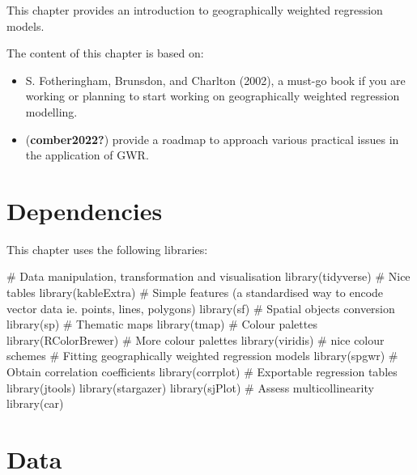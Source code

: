 \documentclass[
  letterpaper,
  krantz2]{style/krantz}
\newenvironment{Shaded}{\begin{snugshade}}{\end{snugshade}}
\newcommand{\CommentTok}[1]{\textcolor[rgb]{0.37,0.37,0.37}{#1}}
\newcommand{\FunctionTok}[1]{\textcolor[rgb]{0.28,0.35,0.67}{#1}}
\newcommand{\NormalTok}[1]{\textcolor[rgb]{0.00,0.23,0.31}{#1}}
\begin{document}
This chapter provides an introduction to geographically weighted
regression models.

The content of this chapter is based on:

\begin{itemize}
\item
  S. Fotheringham, Brunsdon, and Charlton (2002), a must-go book if you
  are working or planning to start working on geographically weighted
  regression modelling.
\item
  (\textbf{comber2022?}) provide a roadmap to approach various practical
  issues in the application of GWR.
\end{itemize}

\hypertarget{dependencies-6}{%
\section{Dependencies}\label{dependencies-6}}

This chapter uses the following libraries:

\begin{Shaded}
\begin{Highlighting}[]
\CommentTok{\# Data manipulation, transformation and visualisation}
\FunctionTok{library}\NormalTok{(tidyverse)}
\CommentTok{\# Nice tables}
\FunctionTok{library}\NormalTok{(kableExtra)}
\CommentTok{\# Simple features (a standardised way to encode vector data ie. points, lines, polygons)}
\FunctionTok{library}\NormalTok{(sf) }
\CommentTok{\# Spatial objects conversion}
\FunctionTok{library}\NormalTok{(sp) }
\CommentTok{\# Thematic maps}
\FunctionTok{library}\NormalTok{(tmap) }
\CommentTok{\# Colour palettes}
\FunctionTok{library}\NormalTok{(RColorBrewer) }
\CommentTok{\# More colour palettes}
\FunctionTok{library}\NormalTok{(viridis) }\CommentTok{\# nice colour schemes}
\CommentTok{\# Fitting geographically weighted regression models}
\FunctionTok{library}\NormalTok{(spgwr)}
\CommentTok{\# Obtain correlation coefficients}
\FunctionTok{library}\NormalTok{(corrplot)}
\CommentTok{\# Exportable regression tables}
\FunctionTok{library}\NormalTok{(jtools)}
\FunctionTok{library}\NormalTok{(stargazer)}
\FunctionTok{library}\NormalTok{(sjPlot)}
\CommentTok{\# Assess multicollinearity}
\FunctionTok{library}\NormalTok{(car)}
\end{Highlighting}
\end{Shaded}

\hypertarget{data-5}{%
\section{Data}\label{data-5}}
\end{document}
